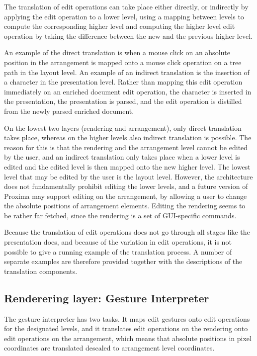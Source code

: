 The translation of edit operations can take place either directly, or indirectly by applying the edit operation to a lower level, using a mapping between levels to compute the corresponding higher level and computing the higher level edit operation by taking the difference between the new and the previous higher level.

An example of the direct translation is when a mouse click on an absolute position in the arrangement is mapped onto a mouse click operation on a tree path in the layout level. An example of an indirect translation is the insertion of a character in the presentation level. Rather than mapping this edit operation immediately on an enriched document edit operation, the character is inserted in the presentation, the presentation is parsed, and the edit operation is distilled from the newly parsed enriched document.

On the lowest two layers (rendering and arrangement), only direct translation takes place, whereas on the higher levels also indirect translation is possible. The reason for this is that the rendering and the arrangement level cannot be edited by the user, and an indirect translation only takes place when a lower level is edited and the edited level is then mapped onto the new higher level. The lowest level that may be edited by the user is the layout level. However, the architecture does not fundamentally prohibit editing the lower levels, and a future version of Proxima may support editing on the arrangement, by allowing a user to change the absolute positions of arrangement elements. Editing the rendering seems to be rather far fetched, since the rendering is a set of GUI-specific commands.

Because the translation of edit operations does not go through all stages like the presentation does, and because of the variation in edit operations, it is not possible to give a running example of the translation process. A number of separate examples are therefore provided together with the descriptions of the translation components.


%																
\subsection{Renderering layer: Gesture Interpreter} \label{sect:gestureInterpreter}

The gesture interpreter has two tasks. It maps edit gestures onto edit operations for the designated levels, and it translates edit operations on the rendering onto edit operations on the arrangement, which means that absolute positions in pixel coordinates are translated descaled to arrangement level coordinates. 

